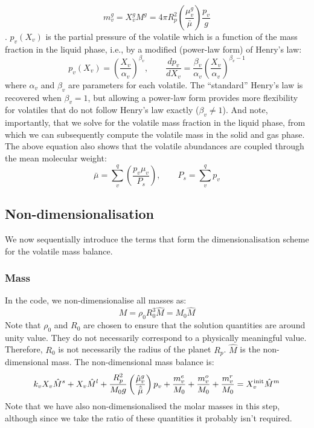 \begin{equation}
m_v^g = X_v^g M^g = 4 \pi R_p^2 \left( \frac{\mu_v^g}{\bar{\mu}} \right) \frac{p_v}{g}
\end{equation}
.  $p_v(X_v)$ is the partial pressure of the volatile which is a function of the mass fraction in the liquid phase, i.e., by a modified (power-law form) of Henry's law:
\begin{equation}
p_v ( X_v ) = \left( \frac{X_v}{\alpha_v} \right)^{\beta_v}, \qquad \frac{dp_v}{d X_v} = \frac{\beta_v}{\alpha_v} \left( \frac{X_v}{\alpha_v} \right)^{\beta_v-1}
\label{eq:Henry_mod}
\end{equation}
where $\alpha_v$ and $\beta_v$ are parameters for each volatile.  The ``standard'' Henry's law is recovered when $\beta_v=1$, but allowing a power-law form provides more flexibility for volatiles that do not follow Henry's law exactly ($\beta_v \neq 1$).  
And note, importantly, that we solve for the volatile mass fraction in the liquid phase, from which we can subsequently compute the volatile mass in the solid and gas phase.  The above equation also shows that the volatile abundances are coupled through the mean molecular weight:
\begin{equation}
\bar{\mu} = \sum_v^q \left( \frac{p_v \mu_v}{P_s} \right), \qquad P_s = \sum_v^q p_v
\label{eq:atmosphere_molar_mass}
\end{equation}
\subsection{Non-dimensionalisation}
We now sequentially introduce the terms that form the dimensionalisation scheme for the volatile mass balance.
\subsubsection{Mass}
In the code, we non-dimensionalise all masses as:
\begin{equation}
M = \rho_0 R_0^3 \hat{M} = M_0 \hat{M}
\end{equation}
Note that $\rho_0$ and $R_0$ are chosen to ensure that the solution quantities are around unity value.  They do not necessarily correspond to a physically meaningful value.  Therefore, $R_0$ is not necessarily the radius of the planet $R_p$.  $\hat{M}$ is the non-dimensional mass.  The non-dimensional mass balance is:
\begin{equation}
k_v X_v \hat{M}^s + X_v \hat{M}^l + \frac{R_p^2}{M_0 g} \left( \frac{\hat{\mu}_v^g}{\hat{\bar{\mu}}} \right) p_v + \frac{m_v^e}{M_0} + \frac{m_v^o}{M_0} + \frac{m_v^r}{M_0} = X_v^{\rm init} \hat{M}^m
\end{equation}
Note that we have also non-dimensionalised the molar masses in this step, although since we take the ratio of these quantities it probably isn't required.

